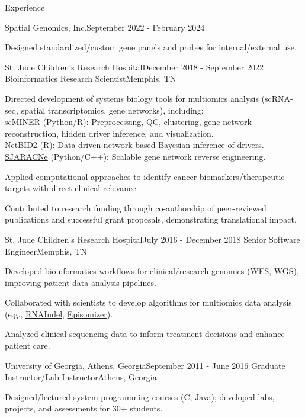 \documentclass{resume} %
\begin{document}
\begin{rSection}{Experience}
\begin{rSubsection}{Spatial Genomics, Inc.}{September 2022 - February 2024}
\item Designed standardized/custom gene panels and probes for internal/external use.
\end{rSubsection}


\begin{rSubsection}{St. Jude Children's Research Hospital}{December 2018 - September 2022}
{Bioinformatics Research Scientist}{Memphis, TN}
\item Directed development of systems biology tools for multiomics analysis (scRNA-seq, spatial transcriptomics, gene networks), including:\\
\href{https://www.nature.com/articles/s41467-025-59620-6}{scMINER} (Python/R): Preprocessing, QC, clustering, gene network reconstruction, hidden driver inference, and visualization.\\
\href{https://www.nature.com/articles/s41467-023-38335-6}{NetBID2} (R): Data-driven network-based Bayesian inference of drivers.\\
\href{https://github.com/jyyulab/SJARACNe}{SJARACNe} (Python/C++): Scalable gene network reverse engineering.

\item Applied computational approaches to identify cancer biomarkers/therapeutic targets with direct clinical relevance.

\item Contributed to research funding through co-authorship of peer-reviewed publications and successful grant proposals, demonstrating translational impact.
\end{rSubsection}


\begin{rSubsection}{St. Jude Children's Research Hospital}{July 2016 - December 2018}
{Senior Software Engineer}{Memphis, TN}
\item Developed bioinformatics workflows for clinical/research genomics (WES, WGS), improving patient data analysis pipelines.

\item Collaborated with scientists to develop algorithms for multiomics data analysis (e.g., \href{https://github.com/stjude/RNAIndel}{RNAIndel}, \href{https://github.com/stjude/Episomizer}{Episomizer}).

\item Analyzed clinical sequencing data to inform treatment decisions and enhance patient care.
\end{rSubsection}


\begin{rSubsection}{University of Georgia, Athens, Georgia}{September 2011 - June 2016}
{Graduate Instructor/Lab Instructor}{Athens, Georgia}
\item Designed/lectured system programming courses (C, Java); developed labs, projects, and assessments for 30+ students.
\end{rSubsection}

\end{rSection}
\end{document}
